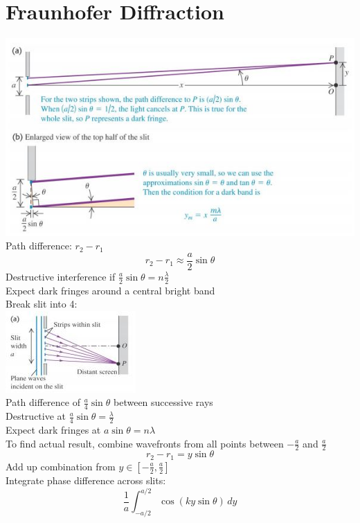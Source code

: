\documentclass[a4paper, 11pt, fleqn, normalem]{report}
\begin{document}
\section{Fraunhofer Diffraction}
\includegraphics{Fraunhofer.jpg} \\
Path difference: $r_{2} - r_{1}$
\begin{equation*}
    r_{2} - r_{1} \approx \frac{a}{2}\sin{\theta}
\end{equation*}
Destructive interference if $\frac{a}{2}\sin{\theta} = n\frac{\lambda}{2}$ \\
Expect dark fringes around a central bright band \\
Break slit into 4: \\
\includegraphics[scale=1.6]{Diffrac1.jpg} \\
Path difference of $\frac{a}{4}\sin{\theta}$ between successive rays \\
Destructive at $\frac{a}{4}\sin{\theta} = \frac{\lambda}{2}$ \\
Expect dark fringes at $a\sin{\theta} = n\lambda$ \\
To find actual result, combine wavefronts from all points between $-\frac{a}{2}$ and $\frac{a}{2}$
\begin{equation*}
    r_{2} - r_{1} = y\sin{\theta}
\end{equation*}
Add up combination from $y \in {[{-\frac{a}{2}},\frac{a}{2}]}$ \\
Integrate phase difference across slits:
\begin{equation*}
    \frac{1}{a} \int_{-a/2}^{a/2} \cos{(ky\sin{\theta})}\,dy
\end{equation*}
\end{document}
